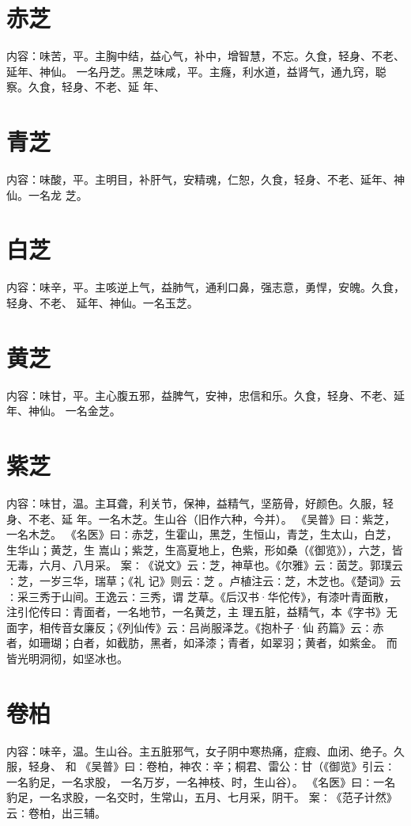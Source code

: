 \documentclass[12pt,UTF8]{ctexbook}
\begin{document}
\section{赤芝}
内容：味苦，平。主胸中结，益心气，补中，增智慧，不忘。久食，轻身、不老、延年、神仙。 
一名丹芝。黑芝味咸，平。主癃，利水道，益肾气，通九窍，聪察。久食，轻身、不老、延 
年、 


\section{青芝}
内容：味酸，平。主明目，补肝气，安精魂，仁恕，久食，轻身、不老、延年、神仙。一名龙 
芝。 


\section{白芝}
内容：味辛，平。主咳逆上气，益肺气，通利口鼻，强志意，勇悍，安魄。久食，轻身、不老、 
延年、神仙。一名玉芝。 


\section{黄芝}
内容：味甘，平。主心腹五邪，益脾气，安神，忠信和乐。久食，轻身、不老、延年、神仙。 
一名金芝。 


\section{紫芝}
内容：味甘，温。主耳聋，利关节，保神，益精气，坚筋骨，好颜色。久服，轻身、不老、延 
年。一名木芝。生山谷（旧作六种，今并）。 
《吴普》曰∶紫芝，一名木芝。 
《名医》曰∶赤芝，生霍山，黑芝，生恒山，青芝，生太山，白芝，生华山；黄芝，生 
嵩山；紫芝，生高夏地上，色紫，形如桑（《御览》），六芝，皆无毒，六月、八月采。 
案∶《说文》云∶芝，神草也。《尔雅》云∶茵芝。郭璞云∶芝，一岁三华，瑞草；《礼 
记》则云∶芝 。卢植注云∶芝，木芝也。《楚词》云∶采三秀于山间。王逸云∶三秀，谓 
芝草。《后汉书·华佗传》，有漆叶青面散，注引佗传曰∶青面者，一名地节，一名黄芝，主 
理五脏，益精气，本《字书》无面字，相传音女廉反；《列仙传》云∶吕尚服泽芝。《抱朴子·仙 
药篇》云∶赤者，如珊瑚；白者，如截肪，黑者，如泽漆；青者，如翠羽；黄者，如紫金。 
而皆光明洞彻，如坚冰也。 


\section{卷柏}
内容：味辛，温。生山谷。主五脏邪气，女子阴中寒热痛，症瘕、血闭、绝子。久服，轻身、 
和 
《吴普》曰∶卷柏，神农∶辛；桐君、雷公∶甘（《御览》引云∶一名豹足，一名求股， 
一名万岁，一名神枝、时，生山谷）。 
《名医》曰∶一名豹足，一名求股，一名交时，生常山，五月、七月采，阴干。 
案∶《范子计然》云∶卷柏，出三辅。 
\end{document}
